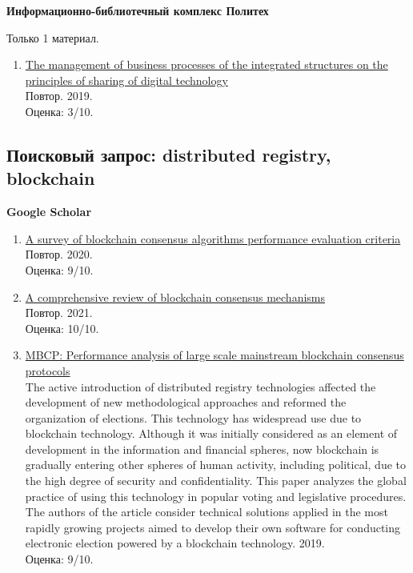 \documentclass[a4paper, 12pt]{report}		%
\begin{document}
\textbf{Информационно-библиотечный комплекс Политех}

Только 1 материал.

\begin{enumerate}
\item \href{https://ruslan.library.spbstu.ru/pwb/detail?db=ANALITS2005&id=8c229831-1a03-4873-b151-28e250859458}{The management of business processes of the integrated structures on the principles of sharing of digital technology}\\
Повтор. 2019.\\
Оценка: 3/10.
\end{enumerate}

\subsection*{Поисковый запрос: distributed registry, blockchain}

\textbf{Google Scholar}

\begin{enumerate}
\item \href{https://www.sciencedirect.com/science/article/abs/pii/S0957417420302098}{A survey of blockchain consensus algorithms performance evaluation criteria}\\
Повтор. 2020.\\
Оценка: 9/10.
\item \href{https://ieeexplore.ieee.org/abstract/document/9376868}{A comprehensive review of blockchain consensus mechanisms}\\
Повтор. 2021.\\
Оценка: 10/10.
\item \href{https://ieeexplore.ieee.org/abstract/document/9444429/}{MBCP: Performance analysis of large scale mainstream blockchain consensus protocols}\\
The active introduction of distributed registry technologies affected the development of new methodological approaches and reformed the organization of elections. This technology has widespread use due to blockchain technology. Although it was initially considered as an element of development in the information and financial spheres, now blockchain is gradually entering other spheres of human activity, including political, due to the high degree of security and confidentiality. This paper analyzes the global practice of using this technology in popular voting and legislative procedures. The authors of the article consider technical solutions applied in the most rapidly growing projects aimed to develop their own software for conducting electronic election powered by a blockchain technology. 2019.\\
Оценка: 9/10.
\end{enumerate}
\end{document}
